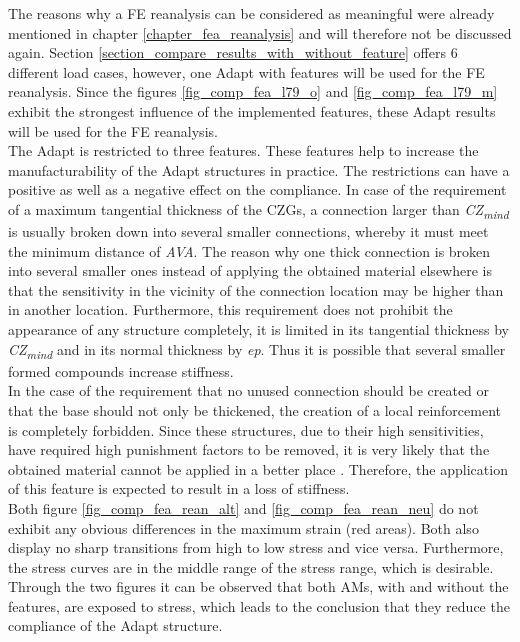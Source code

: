 The reasons why a FE reanalysis can be considered as meaningful 
were already mentioned in chapter \ref{chapter_fea_reanalysis}
and will therefore not be discussed again. Section
\ref{section_compare_results_with_without_feature} offers
6 different load cases, however, one Adapt with features
will be used for the FE reanalysis. Since the figures
\ref{fig_comp_fea_l79_o} and \ref{fig_comp_fea_l79_m} exhibit
the strongest influence of the implemented features, these
Adapt results will
be used for
the FE reanalysis.\\

 The Adapt is restricted to three features.
These features help to increase the manufacturability
 of the Adapt structures in practice.
 The restrictions can have a positive as 
 well as a negative effect on the compliance.
 In case of the requirement of a maximum tangential
  thickness of the CZGs, a connection larger than
   \textit{CZ\textsubscript{mind }} is usually broken down into several 
   smaller connections, whereby it must meet the
    minimum distance of \textit{AVA}. The reason why 
    one thick connection is broken into several smaller
     ones instead of applying the obtained material 
     elsewhere is that the sensitivity in the vicinity of 
     the connection location may be higher than in another location.
     Furthermore, this requirement does not prohibit 
     the appearance of any structure completely, it is limited in 
     its tangential thickness by  \textit{CZ\textsubscript{mind }} and
      in its normal thickness by \textit{ep}. 
      Thus it is possible that several smaller 
      formed compounds increase stiffness. \\
       
       In the case of the requirement that no unused 
       connection should be created or that the 
       base should not only be thickened, the 
       creation of a local reinforcement is completely
        forbidden. Since these structures, due to 
        their high sensitivities, have required high
         punishment factors to be removed, it is 
         very likely that the obtained material
          cannot be applied in a better place . 
          Therefore, the application of this feature
           is expected to result in a loss of stiffness.\\
                        
       Both figure \ref{fig_comp_fea_rean_alt} and 
       \ref{fig_comp_fea_rean_neu} do not  exhibit any obvious
       differences in the maximum strain (red areas).
        Both also  display no sharp transitions from high to low 
        stress and vice versa. Furthermore, the stress
         curves are in the middle range of the
         stress range, which 
         is  desirable.
          Through the two figures it  can be 
          observed that both AMs, with and without the features,
           are exposed to stress, 
           which leads to the conclusion that they 
           reduce the compliance of the Adapt structure.\\
           
